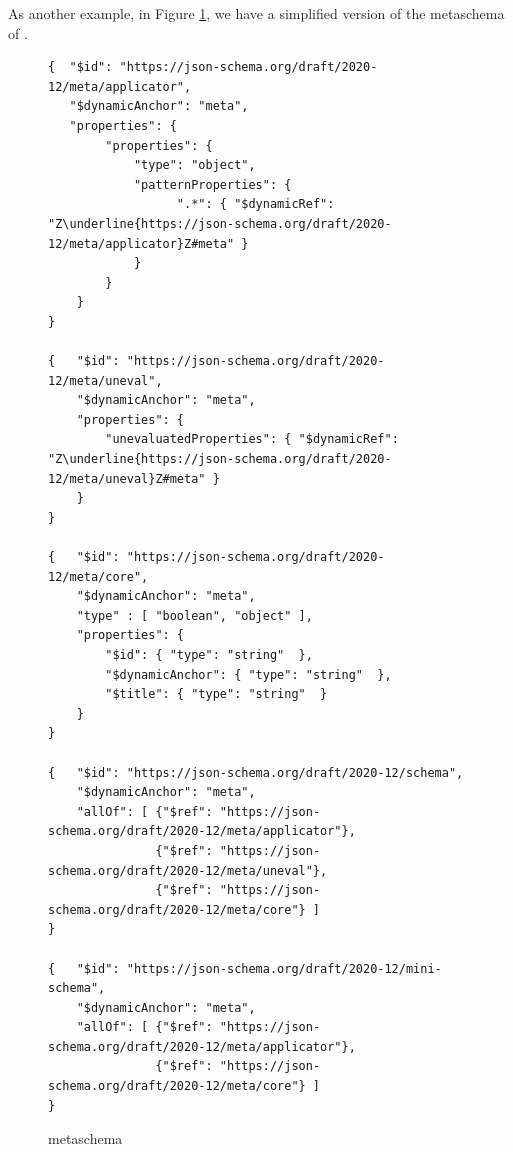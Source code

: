 As another example, in Figure \ref{fig:schema}, we have a simplified version of the metaschema of {\JS}.

\begin{figure}[htb!]
\begin{querybox}{}
\begin{lstlisting}[style=query,escapechar=Z]
{  "$id": "https://json-schema.org/draft/2020-12/meta/applicator",
   "$dynamicAnchor": "meta",
   "properties": {
        "properties": {
            "type": "object",
            "patternProperties": {
                  ".*": { "$dynamicRef": "Z\underline{https://json-schema.org/draft/2020-12/meta/applicator}Z#meta" } 
            }
        }
    }
}

{   "$id": "https://json-schema.org/draft/2020-12/meta/uneval",
    "$dynamicAnchor": "meta",
    "properties": {
        "unevaluatedProperties": { "$dynamicRef": "Z\underline{https://json-schema.org/draft/2020-12/meta/uneval}Z#meta" }
    }
}

{   "$id": "https://json-schema.org/draft/2020-12/meta/core",
    "$dynamicAnchor": "meta",
    "type" : [ "boolean", "object" ],
    "properties": {
        "$id": { "type": "string"  },
        "$dynamicAnchor": { "type": "string"  },
        "$title": { "type": "string"  }
    }
}

{   "$id": "https://json-schema.org/draft/2020-12/schema",
    "$dynamicAnchor": "meta",
    "allOf": [ {"$ref": "https://json-schema.org/draft/2020-12/meta/applicator"},
               {"$ref": "https://json-schema.org/draft/2020-12/meta/uneval"},
               {"$ref": "https://json-schema.org/draft/2020-12/meta/core"} ]  
}

{   "$id": "https://json-schema.org/draft/2020-12/mini-schema",
    "$dynamicAnchor": "meta",
    "allOf": [ {"$ref": "https://json-schema.org/draft/2020-12/meta/applicator"},
               {"$ref": "https://json-schema.org/draft/2020-12/meta/core"} ]
}
\end{lstlisting}
\end{querybox}
\caption{{\JS} metaschema}\label{fig:schema}
\end{figure}


